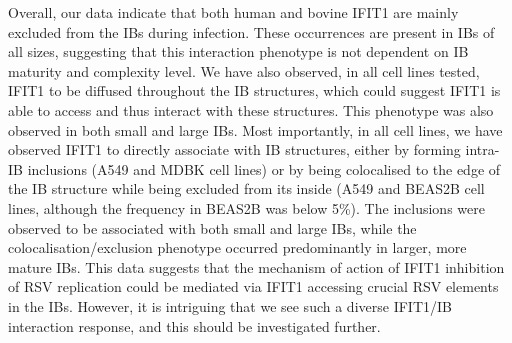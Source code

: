 Overall, our data indicate that both human and bovine IFIT1 are mainly excluded from the IBs during infection. These occurrences are present in IBs of all sizes, suggesting that this interaction phenotype is not dependent on IB maturity and complexity level. We have also observed, in all cell lines tested, IFIT1 to be diffused throughout the IB structures, which could suggest IFIT1 is able to access and thus interact with these structures. This phenotype was also observed in both small and large IBs. Most importantly, in all cell lines, we have observed IFIT1 to directly associate with IB structures, either by forming intra-IB inclusions (A549 and MDBK cell lines) or by being colocalised to the edge of the IB structure while being excluded from its inside (A549 and BEAS2B cell lines, although the frequency in BEAS2B was below 5\%). The inclusions were observed to be associated with both small and large IBs, while the colocalisation/exclusion phenotype occurred predominantly in larger, more mature IBs. This data suggests that the mechanism of action of IFIT1 inhibition of RSV replication could be mediated via IFIT1 accessing crucial RSV elements in the IBs. However, it is intriguing that we see such a diverse IFIT1/IB interaction response, and this should be investigated further.

